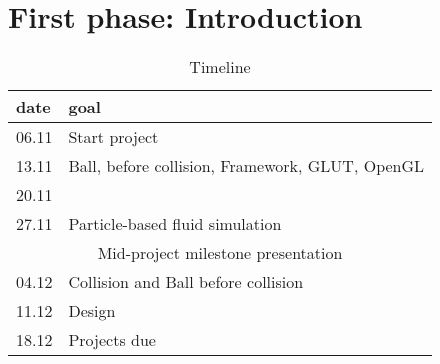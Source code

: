 \chapter*{First phase: Introduction}
\begin{table}
	\centering
	\begin{tabular}{ll}
		\toprule
		date& goal\\
		\midrule
		06.11&Start project\\
		13.11&Ball, before collision, Framework, GLUT, OpenGL\\
		20.11&\\
		27.11&Particle-based fluid simulation\\
		\midrule
		\multicolumn{2}{c}{Mid-project milestone presentation}\\
		\midrule
		04.12&Collision and Ball before collision \\
		11.12&Design\\
		18.12&Projects due\\
		\bottomrule
	\end{tabular}
	\caption{Timeline}
	\label{tab:timeline}
\end{table}
